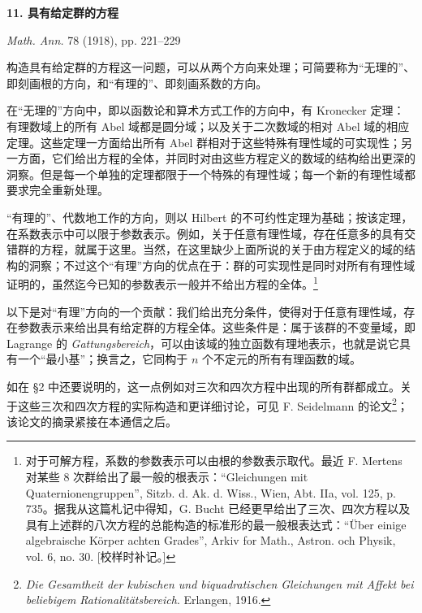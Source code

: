\begin{center}
{\Large\bfseries 11. 具有给定群的方程}\par
\vspace{1.2em}
\emph{Math. Ann.} 78 (1918), pp. 221--229
\end{center}

\vspace{1.5em}

构造具有给定群的方程这一问题，可以从两个方向来处理；可简要称为“无理的”、即刻画根的方向，和“有理的”、即刻画系数的方向。

在“无理的”方向中，即以函数论和算术方式工作的方向中，有 Kronecker 定理：有理数域上的所有 Abel 域都是圆分域；以及关于二次数域的相对 Abel 域的相应定理。这些定理一方面给出所有 Abel 群相对于这些特殊有理性域的可实现性；另一方面，它们给出方程的全体，并同时对由这些方程定义的数域的结构给出更深的洞察。但是每一个单独的定理都限于一个特殊的有理性域；每一个新的有理性域都要求完全重新处理。

“有理的”、代数地工作的方向，则以 Hilbert 的不可约性定理为基础；按该定理，在系数表示中可以限于参数表示。例如，关于任意有理性域，存在任意多的具有交错群的方程，就属于这里。当然，在这里缺少上面所说的关于由方程定义的域的结构的洞察；不过这个“有理”方向的优点在于：群的可实现性是同时对所有有理性域证明的，虽然迄今已知的参数表示一般并不给出方程的全体。\footnote{对于可解方程，系数的参数表示可以由根的参数表示取代。最近 F. Mertens 对某些 8 次群给出了最一般的根表示：“Gleichungen mit Quaternionengruppen”, Sitzb. d. Ak. d. Wiss., Wien, Abt. IIa, vol. 125, p. 735。据我从这篇札记中得知，G. Bucht 已经更早给出了三次、四次方程以及具有上述群的八次方程的总能构造的标准形的最一般根表达式：“Über einige algebraische Körper achten Grades”, Arkiv for Math., Astron. och Physik, vol. 6, no. 30. [校样时补记。]}

以下是对“有理”方向的一个贡献：我们给出充分条件，使得对于任意有理性域，存在参数表示来给出具有给定群的方程全体。这些条件是：属于该群的不变量域，即 Lagrange 的 \emph{Gattungsbereich}，可以由该域的独立函数有理地表示，也就是说它具有一个“最小基”；换言之，它同构于 $n$ 个不定元的所有有理函数的域。

如在 \S 2 中还要说明的，这一点例如对三次和四次方程中出现的所有群都成立。关于这些三次和四次方程的实际构造和更详细讨论，可见 F. Seidelmann 的论文\footnote{\emph{Die Gesamtheit der kubischen und biquadratischen Gleichungen mit Affekt bei beliebigem Rationalitätsbereich}. Erlangen, 1916.}；该论文的摘录紧接在本通信之后。

